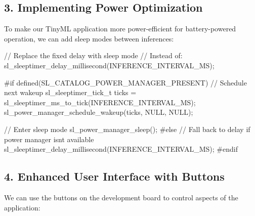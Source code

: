 \documentclass[
  9pt,
  letterpaper,
  abstract,
  titlepage]{scrbook}
\newenvironment{Shaded}{\begin{snugshade}}{\end{snugshade}}
\newcommand{\CommentTok}[1]{\textcolor[rgb]{0.37,0.37,0.37}{#1}}
\newcommand{\NormalTok}[1]{\textcolor[rgb]{0.00,0.23,0.31}{#1}}
\newcommand{\OperatorTok}[1]{\textcolor[rgb]{0.37,0.37,0.37}{#1}}
\newcommand{\PreprocessorTok}[1]{\textcolor[rgb]{0.68,0.00,0.00}{#1}}
\begin{document}
\subsection{3. Implementing Power
Optimization}\label{implementing-power-optimization}

To make our TinyML application more power-efficient for battery-powered
operation, we can add sleep modes between inferences:

\begin{Shaded}
\begin{Highlighting}[]
\CommentTok{// Replace the fixed delay with sleep mode}
\CommentTok{// Instead of: sl\_sleeptimer\_delay\_millisecond(INFERENCE\_INTERVAL\_MS);}

\PreprocessorTok{\#if defined(SL\_CATALOG\_POWER\_MANAGER\_PRESENT)}
  \CommentTok{// Schedule next wakeup}
\NormalTok{  sl\_sleeptimer\_tick\_t ticks }\OperatorTok{=}\NormalTok{ sl\_sleeptimer\_ms\_to\_tick}\OperatorTok{(}\NormalTok{INFERENCE\_INTERVAL\_MS}\OperatorTok{);}
\NormalTok{  sl\_power\_manager\_schedule\_wakeup}\OperatorTok{(}\NormalTok{ticks}\OperatorTok{,}\NormalTok{ NULL}\OperatorTok{,}\NormalTok{ NULL}\OperatorTok{);}
  
  \CommentTok{// Enter sleep mode}
\NormalTok{  sl\_power\_manager\_sleep}\OperatorTok{();}
\PreprocessorTok{\#else}
  \CommentTok{// Fall back to delay if power manager isn\textquotesingle{}t available}
\NormalTok{  sl\_sleeptimer\_delay\_millisecond}\OperatorTok{(}\NormalTok{INFERENCE\_INTERVAL\_MS}\OperatorTok{);}
\PreprocessorTok{\#endif}
\end{Highlighting}
\end{Shaded}

\subsection{4. Enhanced User Interface with
Buttons}\label{enhanced-user-interface-with-buttons}

We can use the buttons on the development board to control aspects of
the application:
\end{document}

